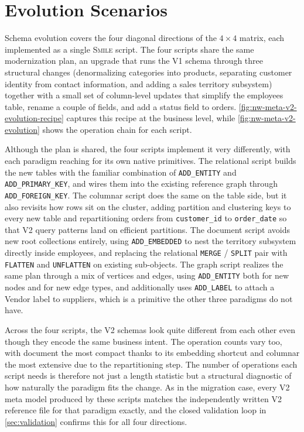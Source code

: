 \section{Evolution Scenarios}\label{sec:eval-evolution}

Schema evolution covers the four diagonal directions of the $4 \times 4$ matrix, each implemented as a single \textsc{Smile} script. The four scripts share the same
  modernization plan, an upgrade that runs the V1 schema through three structural changes (denormalizing categories into products, separating customer identity from
  contact information, and adding a sales territory subsystem) together with a small set of column-level updates that simplify the employees table, rename a couple of
  fields, and add a status field to orders. \autoref{fig:nw-meta-v2-evolution-recipe} captures this recipe at the business level, while
  \autoref{fig:nw-meta-v2-evolution} shows the operation chain for each
  script.

  Although the plan is shared, the four scripts implement it very differently, with each paradigm reaching for its own native primitives. The relational script builds
  the new tables with the familiar combination of \texttt{ADD\_ENTITY} and \texttt{ADD\_PRIMARY\_KEY}, and wires them into the existing reference graph through
  \texttt{ADD\_FOREIGN\_KEY}. The columnar script does the same on the table side, but it also revisits how rows sit on the cluster, adding partition and clustering keys
   to every new table and repartitioning orders from \texttt{customer\_id} to \texttt{order\_date} so that V2 query patterns land on efficient partitions. The document
  script avoids new root collections entirely, using \texttt{ADD\_EMBEDDED} to nest the territory subsystem directly inside employees, and replacing the relational
  \texttt{MERGE} / \texttt{SPLIT} pair with \texttt{FLATTEN} and \texttt{UNFLATTEN} on existing sub-objects. The graph script realizes the same plan through a mix of
  vertices and edges, using \texttt{ADD\_ENTITY} both for new nodes and for new edge types, and additionally uses \texttt{ADD\_LABEL} to attach a Vendor label to
  suppliers, which is a primitive the other three paradigms do not have.

Across the four scripts, the V2 schemas look quite different from each other even though they encode the same business intent. The operation counts vary too, with
  document the most compact thanks to its embedding shortcut and columnar the most extensive due to the repartitioning step. The number of operations each script needs
  is therefore not just a length statistic but a structural diagnostic of how naturally the paradigm fits the change. As in the migration case, every V2 meta model
  produced by these scripts matches the independently written V2 reference file for that paradigm exactly, and the closed validation loop in \autoref{sec:validation}
  confirms this for all four directions.

